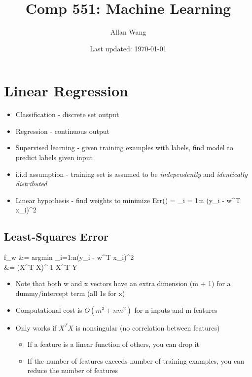 \documentclass[12pt]{article}
\author{Allan Wang}
\date{Last updated: \today}
\title{Comp 551: Machine Learning}
\newenvironment{eqn}{\equation\alignedat{3}}{\endalignedat\endequation}
\begin{document}
\onehalfspacing
\maketitle
\tableofcontents
\pagebreak

\section{Linear Regression}

\begin{itemize}
	\item Classification - discrete set output
	\item Regression - continuous output
	\item Supervised learning - given training examples with labels, find model to predict labels given input
	\item i.i.d assumption - training set is assumed to be \textit{independently} and \textit{identically distributed}
	\item Linear hypothesis - find weights to minimize
	\begin{eqn}
		Err() = \Sigma_{i = 1:n} (y_i - w^T x_i)^2
	\end{eqn}
\end{itemize}

\subsection{Least-Squares Error}

\begin{eqn}
	f_w &= argmin \Sigma_{i=1:n}(y_i - w^T x_i)^2 \\
	 &= (X^T X)^{-1} X^T Y
\end{eqn}
\begin{itemize}
	\item Note that both w and x vectors have an extra dimension (m + 1) for a dummy/intercept term (all 1s for x)
	\item Computational cost is $O(m^3 + nm^2)$ for n inputs and m features
	\item Only works if $X^T X$ is nonsingular (no correlation between features)
	\begin{itemize}
		\item If a feature is a linear function of others, you can drop it
		\item If the number of features exceeds number of training examples, you can reduce the number of features
	\end{itemize}
\end{itemize}
\end{document}
